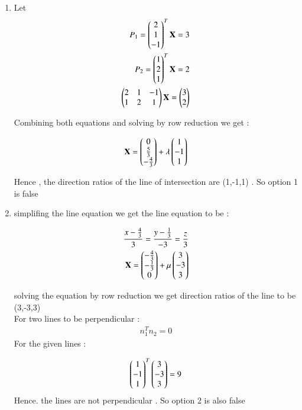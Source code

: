 \documentclass[journal]{IEEEtran}
\begin{document}
\begin{enumerate}

 \item  Let 
\begin{align}
    P_1 = \begin{pmatrix}2\\1\\-1\end{pmatrix}^{T}\mathbf{X} = 3 \\
    P_2 = \begin{pmatrix}1\\2\\1\end{pmatrix}^{T}\mathbf{X} = 2\\
    \begin{pmatrix}2 &1 &-1\\1&2&1\end{pmatrix}\mathbf{X} = \begin{pmatrix}3\\2\end{pmatrix}
\end{align}

Combining both equations and solving by row reduction we get :

\begin{align}
  \mathbf{X} = \begin{pmatrix}0\\ \frac{5}{3} \\ -\frac{4}{3}\end{pmatrix} + \lambda\begin{pmatrix}1\\-1\\1\end{pmatrix}
\end{align}

Hence , the direction ratios of the line of intersection are (1,-1,1) . So option 1 is false

\item 
simplifing the line equation we get the line equation to be :


\begin{align}
 \frac{x-\frac{4}{3}}{3} = \frac{y - \frac{1}{3}}{-3} = \frac{z}{3}\\
 \mathbf{X} = \begin{pmatrix}-\frac{4}{3}\\- \frac{1}{3}\\0\end{pmatrix} + \mu\begin{pmatrix}3\\-3\\3\end{pmatrix}
\end{align}


solving the equation by row reduction we get  direction ratios of the line to be (3,-3,3) \\
For two lines to be perpendicular :
\begin{align}
   n_1^{T}n_2 = 0
\end{align}
For the given lines :

\begin{align}
  \begin{pmatrix}1\\-1\\1\end{pmatrix}^{T} \begin{pmatrix}3 \\-3\\3\end{pmatrix} = 9 
\end{align}
Hence. the lines are not perpendicular . So option 2 is also false 


\end{enumerate}
\end{document}
